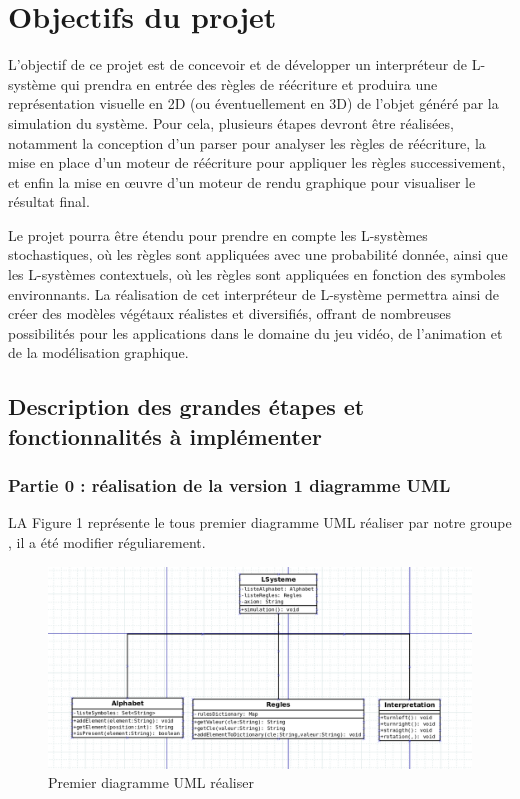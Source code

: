 \section{Objectifs du projet}

L'objectif de ce projet est de concevoir et de développer un interpréteur de L-système qui prendra en entrée des règles de réécriture et produira une représentation visuelle en 2D (ou éventuellement en 3D) de l'objet généré par la simulation du système. Pour cela, plusieurs étapes devront être réalisées, notamment la conception d'un parser pour analyser les règles de réécriture, la mise en place d'un moteur de réécriture pour appliquer les règles successivement, et enfin la mise en œuvre d'un moteur de rendu graphique pour visualiser le résultat final.

Le projet pourra être étendu pour prendre en compte les L-systèmes stochastiques, où les règles sont appliquées avec une probabilité donnée, ainsi que les L-systèmes contextuels, où les règles sont appliquées en fonction des symboles environnants. La réalisation de cet interpréteur de L-système permettra ainsi de créer des modèles végétaux réalistes et diversifiés, offrant de nombreuses possibilités pour les applications dans le domaine du jeu vidéo, de l'animation et de la modélisation graphique.


\subsection{Description des grandes étapes et fonctionnalités à implémenter}

\subsubsection{Partie 0 : réalisation de la version 1 diagramme UML}
LA Figure 1 représente le tous premier diagramme UML réaliser par notre groupe  , il a été modifier réguliarement.
\begin{figure}[h]
\centering
\includegraphics[scale=0.3]{images/version1UML.png}
\caption{Premier diagramme UML réaliser}
\end{figure}
